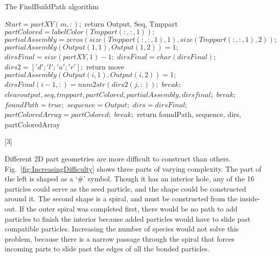 \documentclass[letterpaper, 10 pt, conference]{ieeeconf}
\begin{document}
 
\begin{algorithm} 
\caption{The FindBuildPath algorithm}
\begin{algorithmic}[3]
\newline $Start = partXY(m,:);$
return Output, Seq, Tmppart
\EndFunction
\newline $partColored = labelColor(Tmppart(:,:,1));$
$partialAssembly = zeros(size(Tmppart(:,:,1),1),size(Tmppart(:,:,1),2));$
$partialAssembly(Output(1,1),Output(1,2)) = 1;$
$dirsFinal= size(partXY,1)-1;$
\newline $dirsFinal = char(dirsFinal);$
\newline $dirs2 = ['d';'l';'u';'r'];$
\newline return move
\EndFunction
{}
$partialAssembly(Output(i,1),Output(i,2)) = 1;$
$dirsFinal(i-1,:) = num2str(dirs2(j,:));$
\newline $break;$
\EndIf
\EndFor
{}
\newline$clear output, seq, tmppart, partColored, partialAssembly, dirsfinal;$
$break;$
\EndIf
{}
\newline$foundPath=true; $
\EndIf
\EndFor
{}
\newline$sequence = Output;$
$dirs = dirsFinal;$
$partColoredArray = partColored;$
$break;$ 
\EndIf
\EndFor
\newline return foundPath, sequence, dirs, partColoredArray
\EndFunction
\end{algorithmic}[3]
\end{algorithm} 
  
 
 
 
 



Different 2D part geometries are more difficult to construct than others.  Fig.~\ref{fig:IncreasingDifficulty} shows three parts of varying complexity.  The part of the left is shaped as a `\#' symbol.  Though it has an interior hole, any of the 16 particles could serve as the seed particle, and the shape could be constructed around it.  The second shape is a spiral, and must be constructed from the inside-out.  If the outer spiral was completed first, there would be no path to add particles to finish the interior because added particles would have to slide past compatible particles.  Increasing the number of species would not solve this problem, because there is a narrow passage through the spiral that forces incoming parts to slide past the edges of all the bonded particles.
\end{document}
